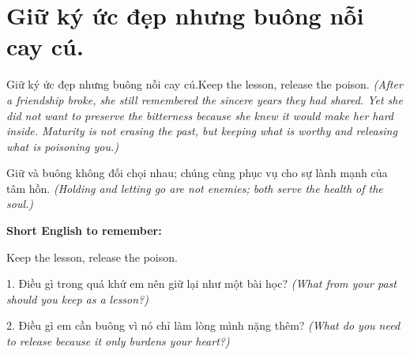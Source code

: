 \section{Giữ ký ức đẹp nhưng buông nỗi cay cú.}
\begin{truyen}{Giữ ký ức đẹp nhưng buông nỗi cay cú.}{Keep the lesson, release the poison.}
\textit{(After a friendship broke, she still remembered the sincere years they had shared. Yet she did not want to preserve the bitterness because she knew it would make her hard inside. Maturity is not erasing the past, but keeping what is worthy and releasing what is poisoning you.)}
\end{truyen}
\begin{baihoc}
Giữ và buông không đối chọi nhau; chúng cùng phục vụ cho sự lành mạnh của tâm hồn.
\textit{(Holding and letting go are not enemies; both serve the health of the soul.)}
\end{baihoc}
\begin{ghinhoanh}
\textbf{Short English to remember:}

Keep the lesson, release the poison.
\end{ghinhoanh}
\begin{tuhocnhanh}
1. Điều gì trong quá khứ em nên giữ lại như một bài học? \textit{(What from your past should you keep as a lesson?)}

2. Điều gì em cần buông vì nó chỉ làm lòng mình nặng thêm? \textit{(What do you need to release because it only burdens your heart?)}
\end{tuhocnhanh}
\ngancach

